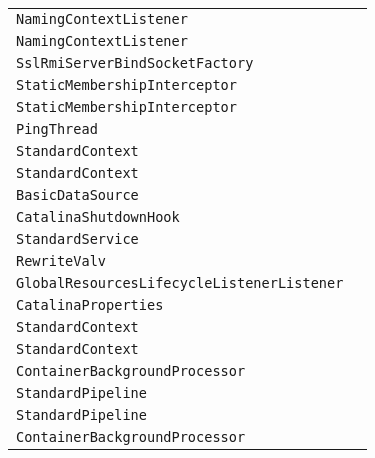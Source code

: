 \begin{center}
\begin{tabular}{ll}
\lstinline/NamingContextListener/&\raisebox{0pt}{\lstinline/ removeResourceLink(String)/}\\ 
\lstinline/NamingContextListener/&\raisebox{0pt}{\lstinline/ removeResourceLink(String)/}\\ 
\lstinline/SslRmiServerBindSocketFactory/&\raisebox{0pt}{\lstinline/ sslRmiServerBindSocketFactory()/}\\ 
\lstinline/StaticMembershipInterceptor/&\raisebox{0pt}{\lstinline/ sendShutdown(Member[]members)/}\\ 
\lstinline/StaticMembershipInterceptor/&\raisebox{0pt}{\lstinline/ sendShutdown(Member[]members)/}\\ 
\lstinline/PingThread/&\raisebox{0pt}{\lstinline/ run()/}\\ 
\lstinline/StandardContext/&\raisebox{0pt}{\lstinline/ checkUnusualURLPattern(String)/}\\ 
\lstinline/StandardContext/&\raisebox{0pt}{\lstinline/ checkUnusualURLPattern(String)/}\\ 
\lstinline/BasicDataSource/&\raisebox{0pt}{\lstinline/ ObjectNamepreRegister(MBeanServer)/}\\ 
\lstinline/CatalinaShutdownHook/&\raisebox{0pt}{\lstinline/ run()/}\\ 
\lstinline/StandardService/&\raisebox{0pt}{\lstinline/ stopInternal())/}\\ 
\lstinline/RewriteValv/&\raisebox{0pt}{\lstinline/ parse(BufferedReaderreader))/}\\ 
\lstinline/GlobalResourcesLifecycleListenerListener/&\raisebox{0pt}{\lstinline/ createMBeans(String))/}\\ 
\lstinline/CatalinaProperties/&\raisebox{0pt}{\lstinline/ loadProperties()/}\\ 
\lstinline/StandardContext/&\raisebox{0pt}{\lstinline/ checkUnusualURLPattern(String)/}\\ 
\lstinline/StandardContext/&\raisebox{0pt}{\lstinline/ checkUnusualURLPattern(String)/}\\ 
\lstinline/ContainerBackgroundProcessor/&\raisebox{0pt}{\lstinline/ processChildren(Container)/}\\ 
\lstinline/StandardPipeline/&\raisebox{0pt}{\lstinline/ removeValve(Valvevalve)/}\\ 
\lstinline/StandardPipeline/&\raisebox{0pt}{\lstinline/ removeValve(Valvevalve)/}\\ 
\lstinline/ContainerBackgroundProcessor/&\raisebox{0pt}{\lstinline/ processChildren(Container)/}\\ 

\end{tabular}
\end{center}

